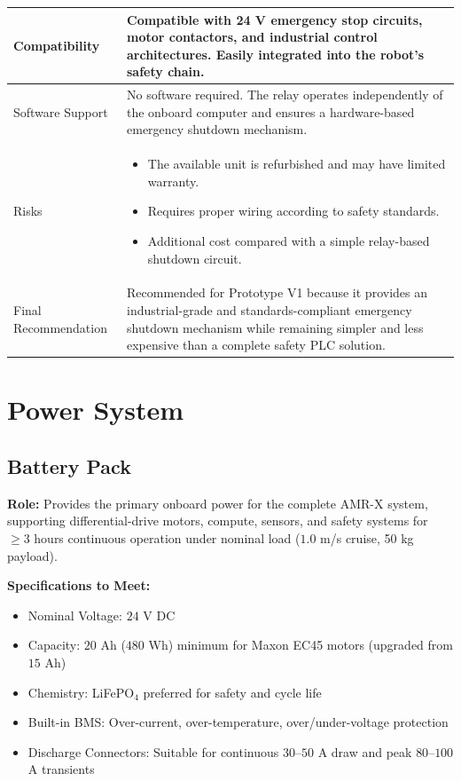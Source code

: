 \documentclass[12pt,a4paper]{article}
\begin{document}
\begin{longtable}{|p{4cm}|p{10cm}|}
Compatibility &
Compatible with 24 V emergency stop circuits, motor contactors, and industrial control architectures. Easily integrated into the robot's safety chain. \\
\hline

Software Support &
No software required. The relay operates independently of the onboard computer and ensures a hardware-based emergency shutdown mechanism. \\
\hline

Risks &
\begin{itemize}
\item The available unit is refurbished and may have limited warranty.
\item Requires proper wiring according to safety standards.
\item Additional cost compared with a simple relay-based shutdown circuit.
\end{itemize}
\\
\hline

Final Recommendation &
Recommended for Prototype V1 because it provides an industrial-grade and standards-compliant emergency shutdown mechanism while remaining simpler and less expensive than a complete safety PLC solution.
\\
\hline

\end{longtable}

\newpage
\section{Power System}

\subsection{Battery Pack}

\textbf{Role:} Provides the primary onboard power for the complete AMR-X system, supporting differential-drive motors, compute, sensors, and safety systems for $\geq 3$ hours continuous operation under nominal load ($1.0$ m/s cruise, 50 kg payload).

\textbf{Specifications to Meet:}
\begin{itemize}
\item Nominal Voltage: $24$ V DC
\item Capacity: $20$ Ah ($480$ Wh) minimum for Maxon EC45 motors (upgraded from $15$ Ah)
\item Chemistry: LiFePO$_4$ preferred for safety and cycle life
\item Built-in BMS: Over-current, over-temperature, over/under-voltage protection
\item Discharge Connectors: Suitable for continuous $30$--$50$ A draw and peak $80$--$100$ A transients
\end{itemize}
\end{document}
